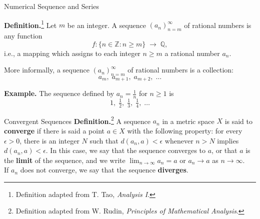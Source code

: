 \documentclass{beamer}
\begin{document}
\begin{frame}{Numerical Sequence and Series}

\textbf{Definition.}\footnote{Definition adapted from T. Tao, \emph{Analysis I}.} Let $m$ be an integer.  
A sequence $(a_n)_{n=m}^{\infty}$ of rational numbers is any function
\[
f: \{ n \in \mathbb{Z} : n \geq m \} \;\to\; \mathbb{Q},
\]
i.e., a mapping which assigns to each integer $n \geq m$ a rational number $a_n$.

\medskip
More informally, a sequence $(a_n)_{n=m}^{\infty}$ of rational numbers is a collection:
\[
a_m, \; a_{m+1}, \; a_{m+2}, \; \dots
\]

\bigskip
\textbf{Example.}  
The sequence defined by $a_n = \tfrac{1}{n}$ for $n \geq 1$ is
\[
1, \; \tfrac{1}{2}, \; \tfrac{1}{3}, \; \tfrac{1}{4}, \; \dots
\]

    
\end{frame}

\begin{frame}{Convergent Sequences}
\textbf{Definition.}\footnote{Definition adapted from W. Rudin, \emph{Principles of Mathematical Analysis}.}
A sequence ${a_n}$ in a metric space $X$ is said to \textbf{converge} if there is said a point $a \in X$ with the following property: for every $\epsilon > 0$, there is an integer $N$ such that $d(a_n, a) < \epsilon$ whenever $n > N$ implies $d(a_n,a)< \epsilon$.  In this case, we say that the sequence converges to $a$, or that $a$ is the \textbf{limit} of the sequence, and we write $\lim_{n \to \infty} a_n = a$ or $a_n \to a$ as $n \to \infty$.\\ 
If ${a_n}$ does not converge, we say that the sequence \textbf{diverges}.
\end{frame}
\end{document}
